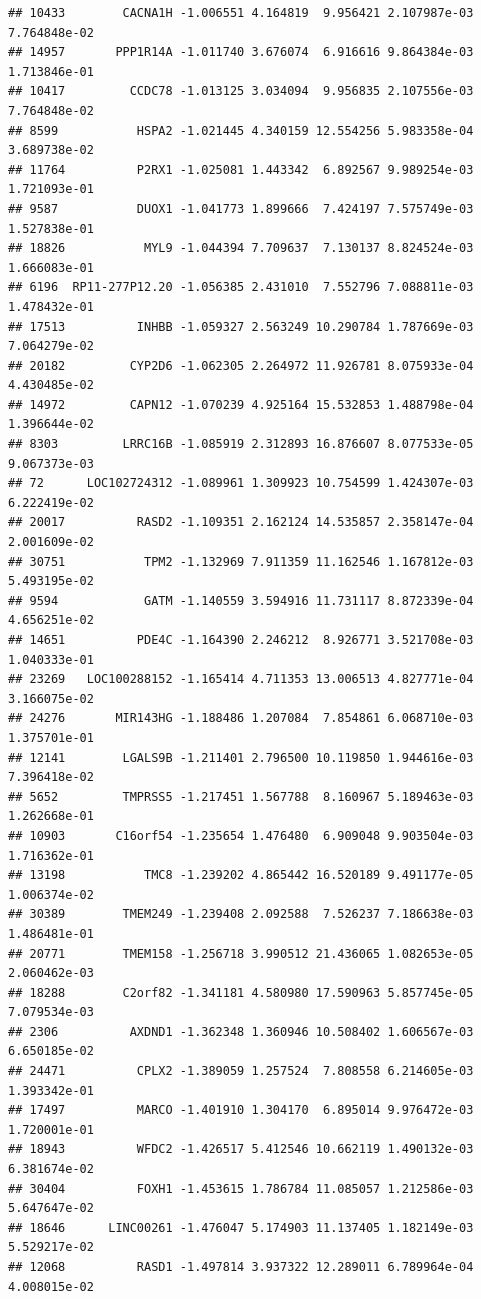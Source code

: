 \documentclass[
]{article}
\begin{document}
\begin{verbatim}
## 10433        CACNA1H -1.006551 4.164819  9.956421 2.107987e-03 7.764848e-02
## 14957       PPP1R14A -1.011740 3.676074  6.916616 9.864384e-03 1.713846e-01
## 10417         CCDC78 -1.013125 3.034094  9.956835 2.107556e-03 7.764848e-02
## 8599           HSPA2 -1.021445 4.340159 12.554256 5.983358e-04 3.689738e-02
## 11764          P2RX1 -1.025081 1.443342  6.892567 9.989254e-03 1.721093e-01
## 9587           DUOX1 -1.041773 1.899666  7.424197 7.575749e-03 1.527838e-01
## 18826           MYL9 -1.044394 7.709637  7.130137 8.824524e-03 1.666083e-01
## 6196  RP11-277P12.20 -1.056385 2.431010  7.552796 7.088811e-03 1.478432e-01
## 17513          INHBB -1.059327 2.563249 10.290784 1.787669e-03 7.064279e-02
## 20182         CYP2D6 -1.062305 2.264972 11.926781 8.075933e-04 4.430485e-02
## 14972         CAPN12 -1.070239 4.925164 15.532853 1.488798e-04 1.396644e-02
## 8303         LRRC16B -1.085919 2.312893 16.876607 8.077533e-05 9.067373e-03
## 72      LOC102724312 -1.089961 1.309923 10.754599 1.424307e-03 6.222419e-02
## 20017          RASD2 -1.109351 2.162124 14.535857 2.358147e-04 2.001609e-02
## 30751           TPM2 -1.132969 7.911359 11.162546 1.167812e-03 5.493195e-02
## 9594            GATM -1.140559 3.594916 11.731117 8.872339e-04 4.656251e-02
## 14651          PDE4C -1.164390 2.246212  8.926771 3.521708e-03 1.040333e-01
## 23269   LOC100288152 -1.165414 4.711353 13.006513 4.827771e-04 3.166075e-02
## 24276       MIR143HG -1.188486 1.207084  7.854861 6.068710e-03 1.375701e-01
## 12141        LGALS9B -1.211401 2.796500 10.119850 1.944616e-03 7.396418e-02
## 5652         TMPRSS5 -1.217451 1.567788  8.160967 5.189463e-03 1.262668e-01
## 10903       C16orf54 -1.235654 1.476480  6.909048 9.903504e-03 1.716362e-01
## 13198           TMC8 -1.239202 4.865442 16.520189 9.491177e-05 1.006374e-02
## 30389        TMEM249 -1.239408 2.092588  7.526237 7.186638e-03 1.486481e-01
## 20771        TMEM158 -1.256718 3.990512 21.436065 1.082653e-05 2.060462e-03
## 18288        C2orf82 -1.341181 4.580980 17.590963 5.857745e-05 7.079534e-03
## 2306          AXDND1 -1.362348 1.360946 10.508402 1.606567e-03 6.650185e-02
## 24471          CPLX2 -1.389059 1.257524  7.808558 6.214605e-03 1.393342e-01
## 17497          MARCO -1.401910 1.304170  6.895014 9.976472e-03 1.720001e-01
## 18943          WFDC2 -1.426517 5.412546 10.662119 1.490132e-03 6.381674e-02
## 30404          FOXH1 -1.453615 1.786784 11.085057 1.212586e-03 5.647647e-02
## 18646      LINC00261 -1.476047 5.174903 11.137405 1.182149e-03 5.529217e-02
## 12068          RASD1 -1.497814 3.937322 12.289011 6.789964e-04 4.008015e-02

\end{verbatim}
\end{document}
